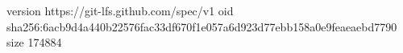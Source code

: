 version https://git-lfs.github.com/spec/v1
oid sha256:6acb9d4a440b22576fac33df670f1e057a6d923d77ebb158a0e9feaeaebd7790
size 174884
